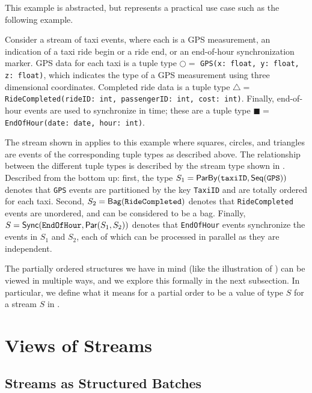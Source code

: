 This example is abstracted, but represents a practical use case such as the following example.

\begin{example}
\label{45:ex:taxi-distance-schema-headers}
\label{45:ex:taxi-distance-schema}
Consider a stream of taxi events, where each is a GPS measurement, an indication of a taxi ride begin or a ride end, or an end-of-hour synchronization marker.
GPS data for each taxi is a tuple type $\bigcirc =$ \texttt{GPS(x: float, y: float, z: float)}, which indicates the type of a GPS measurement using three dimensional coordinates.
Completed ride data is a tuple type $\triangle =$ \texttt{RideCompleted(rideID: int, passengerID: int, cost: int)}.
Finally, end-of-hour events are used to synchronize in time; these are a tuple type $\blacksquare =$ \texttt{EndOfHour(date: date, hour: int)}.

The stream shown in  applies to this example where squares, circles, and triangles are events of the corresponding tuple types as described above.
The relationship between the different tuple types is described by the stream type shown in .
Described from the bottom up: first, the type $S_1 = \mathsf{ParBy}({\texttt{taxiID}}, \mathsf{Seq}({\texttt{GPS}}))$ denotes that \texttt{GPS} events are partitioned by the key \texttt{TaxiID} and are totally ordered for each taxi.
Second, $S_2 = \mathsf{Bag}({\texttt{RideCompleted}})$ denotes that \texttt{RideCompleted} events are unordered, and can be considered to be a bag.
Finally, $S = \mathsf{Sync}({\texttt{EndOfHour}}, \mathsf{Par}({S_1}, {S_2}))$ denotes that \texttt{EndOfHour} events synchronize the events in $S_1$ and $S_2$, each of which can be processed in parallel as they are independent.
\end{example}

The partially ordered structures we have in mind (like the illustration of ) can be viewed in multiple ways, and we explore this formally in the next subsection.
In particular, we define what it means for a partial order to be a value of type $S$ for a stream $S$ in .

\section{Views of Streams}

\subsection{Streams as Structured Batches}
\label{view:batches}

